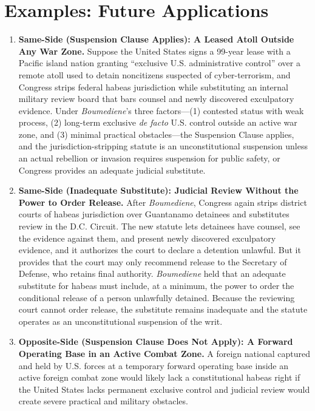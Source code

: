 \documentclass[12pt]{article}
\begin{document}
\section{Examples: Future Applications}
\begin{enumerate}

\item \textbf{Same-Side (Suspension Clause Applies): A Leased Atoll Outside Any War Zone.} Suppose the United States signs a 99-year lease with a Pacific island nation granting ``exclusive U.S. administrative control'' over a remote atoll used to detain noncitizens suspected of cyber-terrorism, and Congress strips federal habeas jurisdiction while substituting an internal military review board that bars counsel and newly discovered exculpatory evidence. Under \textit{Boumediene}'s three factors---(1) contested status with weak process, (2) long-term exclusive \textit{de facto} U.S. control outside an active war zone, and (3) minimal practical obstacles---the Suspension Clause applies, and the jurisdiction-stripping statute is an unconstitutional suspension unless an actual rebellion or invasion requires suspension for public safety, or Congress provides an adequate judicial substitute.

\item \textbf{Same-Side (Inadequate Substitute): Judicial Review Without the Power to Order Release.} After \textit{Boumediene}, Congress again strips district courts of habeas jurisdiction over Guantanamo detainees and substitutes review in the D.C. Circuit. The new statute lets detainees have counsel, see the evidence against them, and present newly discovered exculpatory evidence, and it authorizes the court to declare a detention unlawful. But it provides that the court may only recommend release to the Secretary of Defense, who retains final authority. \textit{Boumediene} held that an adequate substitute for habeas must include, at a minimum, the power to order the conditional release of a person unlawfully detained. Because the reviewing court cannot order release, the substitute remains inadequate and the statute operates as an unconstitutional suspension of the writ.

\item \textbf{Opposite-Side (Suspension Clause Does Not Apply): A Forward Operating Base in an Active Combat Zone.} A foreign national captured and held by U.S. forces at a temporary forward operating base inside an active foreign combat zone would likely lack a constitutional habeas right if the United States lacks permanent exclusive control and judicial review would create severe practical and military obstacles.


\end{enumerate}
\end{document}
